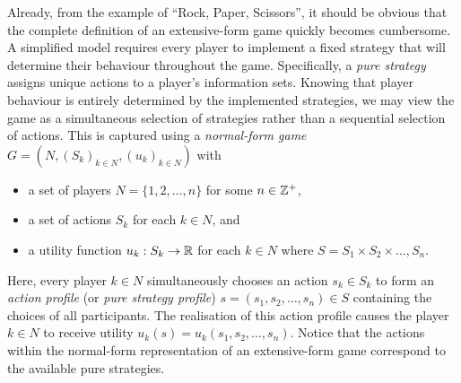     Already, from the example of ``Rock, Paper, Scissors'', it should be obvious that the complete definition of an extensive-form game quickly becomes cumbersome.
    A simplified model requires every player to implement a fixed strategy that will determine their behaviour throughout the game.
    Specifically, a \emph{pure strategy} assigns unique actions to a player's information sets.
    Knowing that player behaviour is entirely determined by the implemented strategies, we may view the game as a simultaneous selection of strategies rather than a sequential selection of actions.
    This is captured using a \emph{normal-form game} $G = (N, (S_k)_{k \in N}, (u_k)_{k \in N})$ with
    \begin{itemize}
        \item a set of players $N = \{1, 2, \ldots, n\}$ for some $n \in \mathbb{Z}^+$,
        \item a set of actions $S_k$ for each $k \in N$, and
        \item a utility function $u_k : S_k \to \mathbb{R}$ for each $k \in N$ where $S = S_1 \times S_2 \times \ldots, S_n$.
    \end{itemize}
    Here, every player $k \in N$ simultaneously chooses an action $s_k \in S_k$ to form an \emph{action profile} (or \emph{pure strategy profile}) $s = (s_1, s_2, \ldots, s_n) \in S$ containing the choices of all participants.
    The realisation of this action profile causes the player $k \in N$ to receive utility $u_k(s) = u_k(s_1, s_2, \ldots, s_n)$.
    Notice that the actions within the normal-form representation of an extensive-form game correspond to the available pure strategies.

